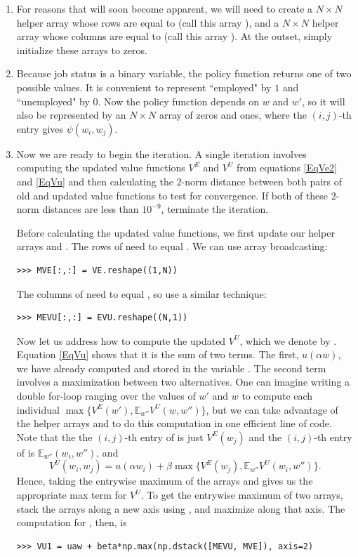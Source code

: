 \begin{problem}
\begin{enumerate}
   \item For reasons that will soon become apparent, we will need to create a $N\times N$ helper array
   whose rows are equal to  (call this array ), and a $N \times N$ helper array whose columns
   are equal to  (call this array ).
   At the outset, simply initialize these arrays to zeros.

   \item Because job status is a binary variable, the policy function returns one of two possible values. It is
   convenient to represent ``employed" by $1$ and ``unemployed" by $0$. Now the policy function depends
   on $w$ and $w'$, so it will also be represented by an $N\times N$ array  of zeros and ones,
   where the $(i,j)$-th entry gives $\psi(w_i, w_j)$.

   \item Now we are ready to begin the iteration.
   A single iteration involves computing the updated value functions $V^E$ and $V^U$ from
   equations \eqref{EqVe2} and \eqref{EqVu} and then calculating the $2$-norm distance between
   both pairs of old and updated value functions to test for convergence. If both of these
   $2$-norm distances are less than $10^{-9}$, terminate the iteration.

   Before calculating the updated value functions, we first update our helper arrays  and
   . The rows of  need to equal . We can use array broadcasting:
\begin{lstlisting}
>>> MVE[:,:] = VE.reshape((1,N))
\end{lstlisting}
   The columns of  need to equal , so use a similar technique:
\begin{lstlisting}
>>> MEVU[:,:] = EVU.reshape((N,1))
\end{lstlisting}

   Now let us address how to compute the updated $V^U$, which we denote by .
   Equation \eqref{EqVu} shows that it is the sum of
   two terms. The first, $u(\alpha w)$, we have already computed and stored in the variable .
   The second term involves a maximization between two alternatives. One can imagine writing
   a double for-loop ranging over the values of $w'$ and $w$ to compute each individual
   $\max\{V^E(w'), \mathbb{E}_{w''}V^U(w,w'')\}$, but we can take advantage of the helper
   arrays  and  to do this computation in one efficient line of code.
   Note that the the $(i,j)$-th entry of  is just $V^E(w_j)$ and the $(i,j)$-th
   entry of  is $\mathbb{E}_{w''}(w_i, w'')$, and
   \[
   V^U(w_i,w_j) = u(\alpha w_i) + \beta\max\{V^E(w_j), \mathbb{E}_{w''}V^U(w_i,w'')\}.
   \]
   Hence, taking the entrywise maximum of the arrays  and  gives us the appropriate
   max term for $V^U$. To get the entrywise maximum of two arrays, stack the arrays along a new
   axis using , and maximize along that axis. The computation for , then, is
   \begin{lstlisting}
>>> VU1 = uaw + beta*np.max(np.dstack([MEVU, MVE]), axis=2)
   \end{lstlisting}


\end{enumerate}
\end{problem}
